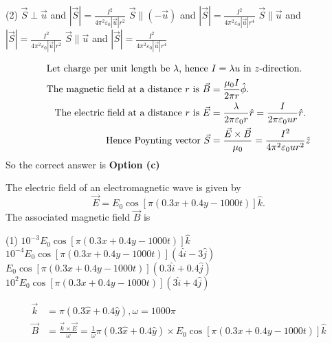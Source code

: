 \begin{enumerate}
\begin{minipage}{\textwidth}
	\end{minipage}
	\begin{tasks}(2)
		\task[\textbf{a.}] $\vec{S} \perp \vec{u}$ and $|\vec{S}|=\frac{I^{2}}{4 \pi^{2} \varepsilon_{0}|\vec{u}| r^{2}}$
		\task[\textbf{b.}]$\vec{S} \|(-\vec{u})$ and $|\vec{S}|=\frac{I^{2}}{4 \pi^{2} \varepsilon_{0}|\vec{u}| r^{4}}$
		\task[\textbf{c.}]$\vec{S} \| \vec{u}$ and $|\vec{S}|=\frac{I^{2}}{4 \pi^{2} \varepsilon_{0}|\vec{u}| r^{2}}$
		\task[\textbf{d.}]$\vec{S} \| \vec{u}$ and $|\vec{S}|=\frac{I^{2}}{4 \pi^{2} \varepsilon_{0}|\vec{u}| r^{4}}$
	\end{tasks}
\begin{answer}
	\begin{align*}
	\intertext{Let charge per unit length be $\lambda$, hence $I=\lambda u$ in $z$-direction.}
	\text{The magnetic field at a distance $r$ is }\vec{B}&=\frac{\mu_{0} I}{2 \pi r} \hat{\phi}.\\
	\text{The electric field at a distance $r$ is }\vec{E}&=\frac{\lambda}{2 \pi \varepsilon_{0} r} \hat{r}=\frac{I}{2 \pi \varepsilon_{0} u r} \hat{r}.\\
	\text{Hence Poynting vector }\vec{S}&=\frac{\vec{E} \times \vec{B}}{\mu_{0}}=\frac{I^{2}}{4 \pi^{2} \varepsilon_{0} u r^{2}} \hat{z}
	\end{align*}
	So the correct answer is \textbf{Option (c)}
\end{answer}
	\begin{minipage}{\textwidth}
		\item The electric field of an electromagnetic wave is given by
		$$
		\vec{E}=E_{0} \cos [\pi(0.3 x+0.4 y-1000 t)] \hat{k} .
		$$
		The associated magnetic field $\vec{B}$ is
	\end{minipage}
	\begin{tasks}(1)
		\task[\textbf{a.}] $10^{-3} E_{0} \cos [\pi(0.3 x+0.4 y-1000 t)] \hat{k}$
		\task[\textbf{b.}]$10^{-4} E_{0} \cos [\pi(0.3 x+0.4 y-1000 t)](4 \hat{i}-3 \hat{j})$
		\task[\textbf{c.}]$E_{0} \cos [\pi(0.3 x+0.4 y-1000 t)](0.3 \hat{i}+0.4 \hat{j})$
		\task[\textbf{d.}]$10^{2} E_{0} \cos [\pi(0.3 x+0.4 y-1000 t)](3 \hat{i}+4 \hat{j})$
	\end{tasks}
\begin{answer}
	\begin{align*}
	\vec{k}&=\pi(0.3 \hat{x}+0.4 \hat{y}), \omega=1000 \pi\\
	\vec{B}&=\frac{\vec{k} \times \vec{E}}{\omega}=\frac{1}{\omega} \pi(0.3 \hat{x}+0.4 \hat{y}) \times E_{0} \cos [\pi(0.3 x+0.4 y-1000 t)] \hat{k}\\

\end{align*}
\end{answer}
\end{enumerate}
